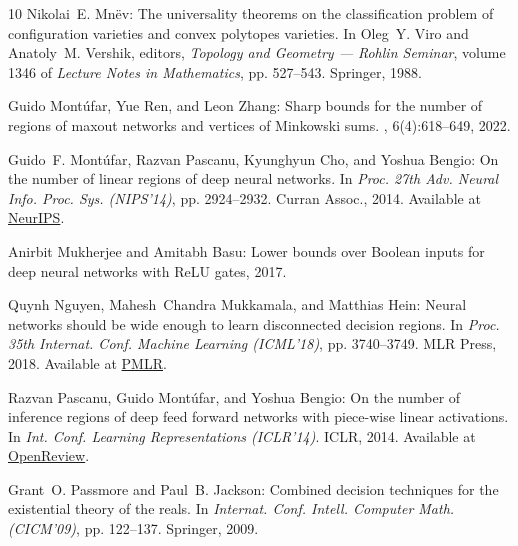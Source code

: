 \begin{thebibliography}{10}
{\sc Nikolai~E. Mn{\"{e}}v}: The universality theorems on the classification
  problem of configuration varieties and convex polytopes varieties.
\newblock In {\sc Oleg~Y. Viro and Anatoly~M. Vershik}, editors, {\em Topology
  and Geometry --- Rohlin Seminar}, volume 1346 of {\em Lecture Notes in
  Mathematics}, pp. 527--543. Springer, 1988.

{\sc Guido Mont{\'u}far, Yue Ren, and Leon Zhang}: Sharp bounds for the number
  of regions of maxout networks and vertices of {M}inkowski sums.
, 6(4):618--649, 2022.
\newblock [\epfmtdoi{10.1137/21M1413699}]

{\sc Guido~F. Mont\'{u}far, Razvan Pascanu, Kyunghyun Cho, and Yoshua Bengio}:
  On the number of linear regions of deep neural networks.
\newblock In {\em Proc. 27th Adv. Neural Info. Proc. Sys. (NIPS'14)}, pp.
  2924--2932. Curran Assoc., 2014.
\newblock Available at
  \href{https://papers.nips.cc/paper_files/paper/2014/hash/fa6f2a469cc4d61a92d96e74617c3d2a-Abstract.html}{NeurIPS}.

{\sc Anirbit Mukherjee and Amitabh Basu}: Lower bounds over {B}oolean inputs
  for deep neural networks with {ReLU} gates, 2017.

{\sc Quynh Nguyen, Mahesh~Chandra Mukkamala, and Matthias Hein}: Neural
  networks should be wide enough to learn disconnected decision regions.
\newblock In {\em Proc. 35th Internat. Conf. Machine Learning (ICML'18)}, pp.
  3740--3749. MLR Press, 2018.
\newblock Available at
  \href{https://proceedings.mlr.press/v80/nguyen18b.html}{PMLR}.

{\sc Razvan Pascanu, Guido Mont\'{u}far, and Yoshua Bengio}: On the number of
  inference regions of deep feed forward networks with piece-wise linear
  activations.
\newblock In {\em Int. Conf. Learning Representations (ICLR'14)}. ICLR, 2014.
\newblock Available at
  \href{https://openreview.net/forum?id=bSaT4mmQt84Lx}{OpenReview}.

{\sc Grant~O. Passmore and Paul~B. Jackson}: Combined decision techniques for
  the existential theory of the reals.
\newblock In {\em Internat. Conf. Intell. Computer Math. (CICM'09)}, pp.
  122--137. Springer, 2009.
\newblock [\epfmtdoi{10.1007/978-3-642-02614-0\_14}]


\end{thebibliography}
